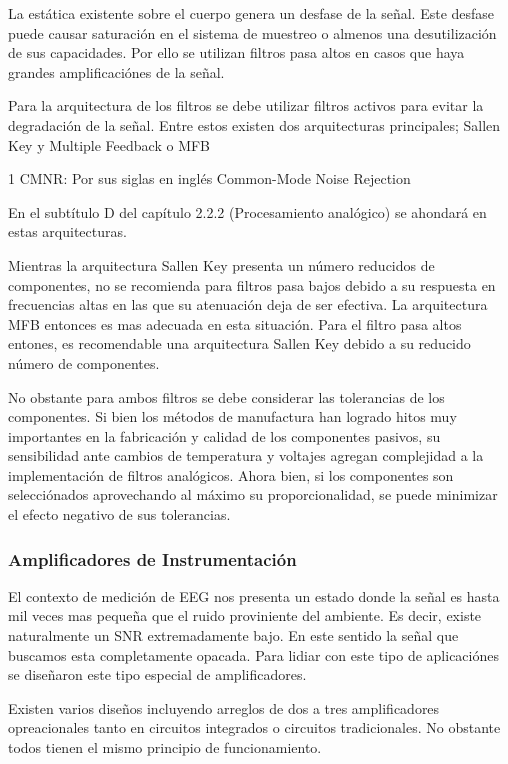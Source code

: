 \documentclass[11pt]{article}
\begin{document}
La estática existente sobre el cuerpo genera un desfase de la señal. Este desfase puede causar saturación en el sistema de muestreo o almenos una desutilización de sus capacidades. Por ello se utilizan filtros pasa altos en casos que haya grandes amplificaciónes de la señal.

Para la arquitectura de los filtros se debe utilizar filtros activos para evitar la degradación de la señal. Entre estos existen dos arquitecturas principales; Sallen Key y Multiple Feedback o MFB

1 CMNR: Por sus siglas en inglés Common-Mode Noise Rejection

En el subtítulo D del capítulo 2.2.2 (Procesamiento analógico) se ahondará en estas arquitecturas.

Mientras la arquitectura Sallen Key presenta un número reducidos de componentes, no se recomienda para filtros pasa bajos debido a su respuesta en frecuencias altas en las que su atenuación deja de ser efectiva. La arquitectura MFB entonces es mas adecuada en esta situación. Para el filtro pasa altos entones, es recomendable una arquitectura Sallen Key debido a su reducido número de componentes.

No obstante para ambos filtros se debe considerar las tolerancias de los componentes. Si bien los métodos de manufactura han logrado hitos muy importantes en la fabricación y calidad de los componentes pasivos, su sensibilidad ante cambios de temperatura y voltajes agregan complejidad a la implementación de filtros analógicos. Ahora bien, si los componentes son selecciónados aprovechando al máximo su proporcionalidad, se puede minimizar el efecto negativo de sus tolerancias.

\subsubsection{Amplificadores de Instrumentación}
\label{sec:orgbae40bc}
El contexto de medición de EEG nos presenta un estado donde la señal es hasta mil veces mas pequeña que el ruido proviniente del ambiente. Es decir, existe naturalmente un SNR extremadamente bajo. En este sentido la señal que buscamos esta completamente opacada.
Para lidiar con este tipo de aplicaciónes se diseñaron este tipo especial de amplificadores.

Existen varios diseños incluyendo arreglos de dos a tres amplificadores opreacionales tanto en circuitos integrados o circuitos tradicionales. No obstante todos tienen el mismo principio de funcionamiento.
\end{document}
